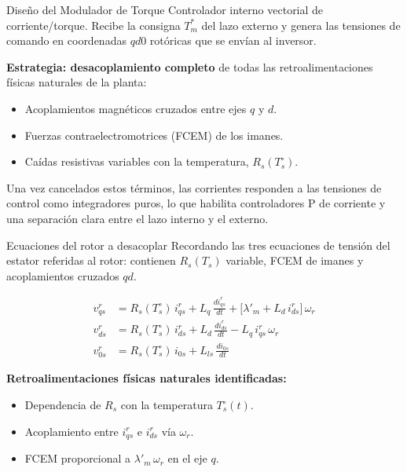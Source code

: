 \documentclass[aspectratio=169,t]{beamer}
\begin{document}
\begin{frame}{Diseño del Modulador de Torque}
{\small\color{uncGray}Controlador interno vectorial de corriente/torque. Recibe la consigna $T_m^{*}$ del lazo externo y genera las tensiones de comando en coordenadas $qd0$ rotóricas que se envían al inversor.}\par
\vspace{4mm}

\textbf{Estrategia: desacoplamiento completo} de todas las retroalimentaciones físicas naturales de la planta:
\begin{itemize}
\item Acoplamientos magnéticos cruzados entre ejes $q$ y $d$.
\item Fuerzas contraelectromotrices (FCEM) de los imanes.
\item Caídas resistivas variables con la temperatura, $R_s(T_s^\circ)$.
\end{itemize}

\vspace{2mm}
{\small Una vez cancelados estos términos, las corrientes responden a las tensiones de control como integradores puros, lo que habilita controladores P de corriente y una separación clara entre el lazo interno y el externo.}
\end{frame}

\begin{frame}{Ecuaciones del rotor a desacoplar}
{\small\color{uncGray}Recordando las tres ecuaciones de tensión del estator referidas al rotor: contienen $R_s(T_s)$ variable, FCEM de imanes y acoplamientos cruzados $qd$.}\par
\vspace{2mm}

\begin{align*}
v_{qs}^{r} &= R_s(T_s^\circ)\,i_{qs}^{r} + L_q\,\tfrac{d i_{qs}^{r}}{dt} + \big[\lambda'_m + L_d\,i_{ds}^{r}\big]\,\omega_r \\[3pt]
v_{ds}^{r} &= R_s(T_s^\circ)\,i_{ds}^{r} + L_d\,\tfrac{d i_{ds}^{r}}{dt} - L_q\,i_{qs}^{r}\,\omega_r \\[3pt]
v_{0s}^{r} &= R_s(T_s^\circ)\,i_{0s} + L_{ls}\,\tfrac{d i_{0s}}{dt}
\end{align*}

\vspace{2mm}
\textbf{Retroalimentaciones físicas naturales identificadas:}
\begin{itemize}
\item Dependencia de $R_s$ con la temperatura $T_s^\circ(t)$.
\item Acoplamiento entre $i_{qs}^{r}$ e $i_{ds}^{r}$ vía $\omega_r$.
\item FCEM proporcional a $\lambda'_m\,\omega_r$ en el eje $q$.
\end{itemize}
\end{frame}
\end{document}
